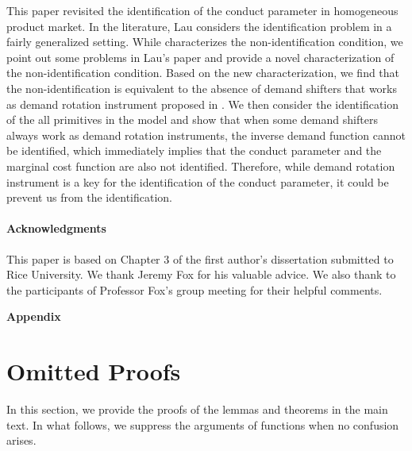 \documentclass[11pt, a4paper]{article}
\theoremstyle{remark}
\newcommand{\appendixsection}{%
  \setcounter{section}{0}%
  \renewcommand{\thesection}{\Alph{section}}%
  \renewcommand{\thetheorem}{\Alph{section}.\arabic{theorem}}%
  \renewcommand{\thelemma}{\Alph{section}.\arabic{lemma}}%
  \renewcommand{\theproposition}{\Alph{section}.\arabic{proposition}}%
  \renewcommand{\thecorollary}{\Alph{section}.\arabic{corollary}}%
  \renewcommand{\thedefinition}{\Alph{section}.\arabic{definition}}%
}
\begin{document}
This paper revisited the identification of the conduct parameter in homogeneous product market.
In the literature, Lau considers the identification problem in a fairly generalized setting.
While \citet{lauIdentifying1982} characterizes the non-identification condition, we point out some problems in Lau's paper and provide a novel characterization of the non-identification condition.
Based on the new characterization, we find that the non-identification is equivalent to the absence of demand shifters that works as demand rotation instrument proposed in \citet{bresnahanOligopoly1982}.
We then consider the identification of the all primitives in the model and show that when some demand shifters always work as demand rotation instruments, the inverse demand function cannot be identified, which immediately implies that the conduct parameter and the marginal cost function are also not identified.
Therefore, while demand rotation instrument is a key for the identification of the conduct parameter, it could be prevent us from the identification.



\paragraph{Acknowledgments}
This paper is based on Chapter 3 of the first author's dissertation submitted to Rice University.
We thank Jeremy Fox for his valuable advice.
We also thank to the participants of Professor Fox's group meeting for their helpful comments.







\newpage
\appendix
\appendixsection
{}

\begin{center}
\huge\textbf{Appendix}
\end{center}
\vspace{1mm}

\section{Omitted Proofs}\label{appendix:proof}
In this section, we provide the proofs of the lemmas and theorems in the main text.
In what follows, we suppress the arguments of functions when no confusion arises.
\end{document}
